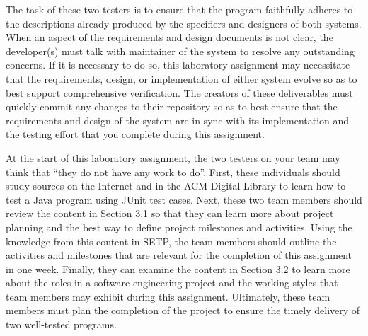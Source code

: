 The task of these two testers is to ensure that the program faithfully adheres to the descriptions already produced by
the specifiers and designers of both systems. When an aspect of the requirements and design documents is not clear, the
developer(s) must talk with maintainer of the system to resolve any outstanding concerns. If it is necessary to do so,
this laboratory assignment may necessitate that the requirements, design, or implementation of either system evolve so
as to best support comprehensive verification.  The creators of these deliverables must quickly commit any changes to
their repository so as to best ensure that the requirements and design of the system are in sync with its
implementation and the testing effort that you complete during this assignment.

At the start of this laboratory assignment, the two testers on your team may think that ``they do not have any work to
do''. First, these individuals should study sources on the Internet and in the ACM Digital Library to learn how to test
a Java program using JUnit test cases. Next, these two team members should review the content in Section 3.1 so that they
can learn more about project planning and the best way to define project milestones and activities. Using the knowledge
from this content in SETP, the team members should outline the activities and milestones that are relevant for the
completion of this assignment in one week. Finally, they can examine the content in Section 3.2 to learn more about the
roles in a software engineering project and the working styles that team members may exhibit during this assignment.
Ultimately, these team members must plan the completion of the project to ensure the timely delivery of two well-tested
programs.



